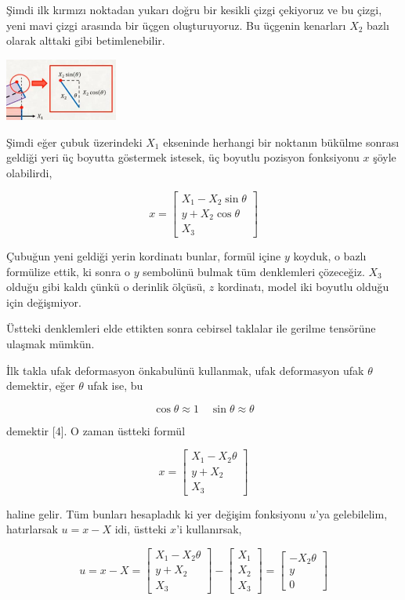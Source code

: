 \documentclass[12pt,fleqn]{article}\usepackage{../../common}
\begin{document}
Şimdi ilk kırmızı noktadan yukarı doğru bir kesikli çizgi çekiyoruz ve bu çizgi,
yeni mavi çizgi arasında bir üçgen oluşturuyoruz. Bu üçgenin kenarları $X_2$
bazlı olarak alttaki gibi betimlenebilir.

\includegraphics[width=10em]{phy_020_strs_02_14.jpg}

Şimdi eğer çubuk üzerindeki $X_1$ ekseninde herhangi bir noktanın bükülme
sonrası geldiği yeri üç boyutta göstermek istesek, üç boyutlu pozisyon
fonksiyonu $x$ şöyle olabilirdi,

$$
x = \left[\begin{array}{c}
X_1 - X_2 \sin \theta \\ y + X_2 \cos\theta \\ X_3
\end{array}\right]
$$

Çubuğun yeni geldiği yerin kordinatı bunlar, formül içine $y$ koyduk, o bazlı
formülize ettik, ki sonra o $y$ sembolünü bulmak tüm denklemleri çözeceğiz.
$X_3$ olduğu gibi kaldı çünkü o derinlik ölçüsü, $z$ kordinatı, model iki
boyutlu olduğu için değişmiyor.

Üstteki denklemleri elde ettikten sonra cebirsel taklalar ile gerilme
tensörüne ulaşmak mümkün.

İlk takla ufak deformasyon önkabulünü kullanmak, ufak deformasyon ufak $\theta$
demektir, eğer $\theta$ ufak ise, bu

$$
\cos\theta \approx 1 \quad \sin\theta \approx \theta
$$

demektir [4]. O zaman üstteki formül

$$
x = \left[\begin{array}{c}
X_1 - X_2 \theta \\ y + X_2 \\ X_3
\end{array}\right]
$$

haline gelir. Tüm bunları hesapladık ki yer değişim fonksiyonu $u$'ya
gelebilelim, hatırlarsak $u = x - X$ idi, üstteki $x$'i kullanırsak,

$$
u = x - X =
\left[\begin{array}{c}
X_1 - X_2 \theta \\ y + X_2 \\ X_3
\end{array}\right] -
\left[\begin{array}{ccc}
X_1 \\ X_2 \\ X_3
\end{array}\right] =
\left[\begin{array}{ccc}
-X_2 \theta \\ y \\ 0
\end{array}\right] 
$$
\end{document}
